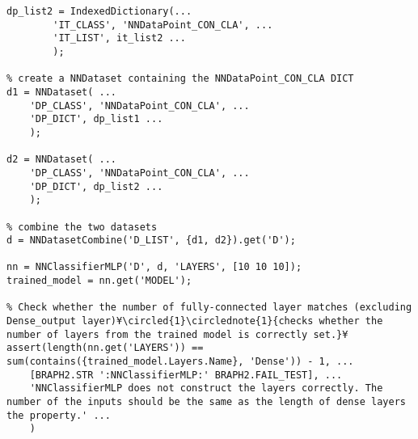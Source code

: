 \documentclass{tufte-handout}
\begin{document}
\begin{lstlisting}
dp_list2 = IndexedDictionary(...
        'IT_CLASS', 'NNDataPoint_CON_CLA', ...
        'IT_LIST', it_list2 ...
        );

% create a NNDataset containing the NNDataPoint_CON_CLA DICT
d1 = NNDataset( ...
    'DP_CLASS', 'NNDataPoint_CON_CLA', ...
    'DP_DICT', dp_list1 ...
    );

d2 = NNDataset( ...
    'DP_CLASS', 'NNDataPoint_CON_CLA', ...
    'DP_DICT', dp_list2 ...
    );

% combine the two datasets
d = NNDatasetCombine('D_LIST', {d1, d2}).get('D');

nn = NNClassifierMLP('D', d, 'LAYERS', [10 10 10]);
trained_model = nn.get('MODEL');

% Check whether the number of fully-connected layer matches (excluding Dense_output layer)¥\circled{1}\circlednote{1}{checks whether the number of layers from the trained model is correctly set.}¥
assert(length(nn.get('LAYERS')) == sum(contains({trained_model.Layers.Name}, 'Dense')) - 1, ...
    [BRAPH2.STR ':NNClassifierMLP:' BRAPH2.FAIL_TEST], ...
    'NNClassifierMLP does not construct the layers correctly. The number of the inputs should be the same as the length of dense layers the property.' ...
    )

\end{lstlisting}

%
%
\end{document}
